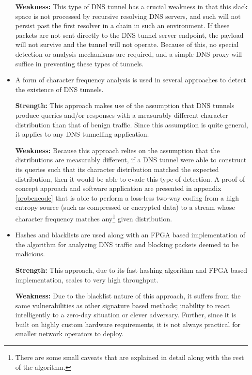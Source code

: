 \documentclass[12pt]{report}
\theoremstyle{remark}
\theoremstyle{definition}
\theoremstyle{definition}
\theoremstyle{definition}
\begin{document}
\begin{itemize}
\textbf{Weakness:} This type of DNS tunnel has a crucial weakness in that this
slack space is not processed by recursive resolving DNS servers, and such will
not persist past the first resolver in a chain in such an environment. If these
packets are not sent directly to the DNS tunnel server endpoint, the payload
will not survive and the tunnel will not operate. Because of this, no special
detection or analysis mechanisms are required, and a simple DNS proxy will
suffice in preventing these types of tunnels.

\item A form of character frequency analysis is used in several approaches to
detect the existence of DNS tunnels.

\textbf{Strength:} This approach makes use of the assumption that DNS tunnels
produce queries and/or responses with a measurably different character
distribution than that of benign traffic. Since this assumption is quite
general, it applies to any DNS tunnelling application.

\textbf{Weakness:} Because this approach relies on the assumption that the
distributions are measurably different, if a DNS tunnel were able to construct
its queries such that its character distribution matched the expected
distribution, then it would be able to evade this type of detection. A
proof-of-concept approach and software application are presented in appendix
\ref{probencode} that is able to perform a loss-less two-way coding from a high
entropy source (such as compressed or encrypted data) to a stream whose
character frequency matches any\footnote{There are some small caveats that are
explained in detail along with the rest of the algorithm.} given distribution.

\item Hashes and blacklists are used along with an FPGA based implementation of
the algorithm for analyzing DNS traffic and blocking packets deemed to be
malicious.

\textbf{Strength:} This approach, due to its fast hashing algorithm and FPGA
based implementation, scales to very high throughput.

\textbf{Weakness:} Due to the blacklist nature of this approach, it suffers from
the same vulnerabilities as other signature based methods; inability to react
intelligently to a zero-day situation or clever adversary. Further, since it is
built on highly custom hardware requirements, it is not always practical for
smaller network operators to deploy.


\end{itemize}
\end{document}
